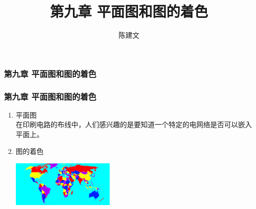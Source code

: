 \documentclass{beamer}
\begin{document}
\begin{CJK}{UTF8}{gbsn}
\newtheorem{definition9.1.1}{定义9.1.1}
\newtheorem{definition9.1.2}{定义9.1.2}
\newtheorem{theorem9.1.1}{定理9.1.1（欧拉公式）}
\newtheorem{corollary9.1.1}{推论9.1.1}
\newtheorem{corollary9.1.2}{推论9.1.2}
\newtheorem{corollary9.1.3}{推论9.1.3}
\newtheorem{corollary9.1.4}{推论9.1.4}
\newtheorem{corollary9.1.5}{推论9.1.5}
\newtheorem{corollary9.1.6}{推论9.1.6}
\newtheorem{theorem9.2.1}{定理9.2.1}
\newtheorem{definition9.3.1}{定义9.3.1}
\newtheorem{definition9.3.2}{定义9.3.2}
\newtheorem{definition9.3.3}{定义9.3.3}
\newtheorem{definition9.3.4}{定义9.3.4}
\newtheorem{theorem9.3.1}{定理9.3.1}
\newtheorem{theorem9.3.2}{定理9.3.2}
\newtheorem{definition9.4.1}{定义9.4.1}
\newtheorem{definition9.4.2}{定义9.4.2}
\newtheorem{theorem9.4.1}{定理9.4.1}
\newtheorem{theorem9.4.2}{定理9.4.2}
\newtheorem{theorem9.4.3}{定理9.4.3}
\newtheorem{theorem9.4.4}{定理9.4.4}
\newtheorem{theorem9.4.5}{定理9.4.5}
\newtheorem{theorem9.4.6}{定理9.4.6}
\newtheorem{exercise1}{习题1}
\newtheorem{exercise2}{习题2}
\newtheorem{exercise3}{习题3}
\newtheorem{exercise4}{习题4}
\date{}
\author{陈建文}

\title{第九章 平面图和图的着色}
\begin{frame}
  \titlepage
  
\end{frame}
\begin{frame}
  \frametitle{第九章 平面图和图的着色}
\end{frame}

\begin{frame}
  \frametitle{第九章 平面图和图的着色}
  \begin{enumerate}
  \item 平面图\\
\pause
在印刷电路的布线中，人们感兴趣的是要知道一个特定的电网络是否可以嵌入平面上。
\pause
\item 图的着色\\
\pause
\includegraphics[width=5cm,height=3cm]{Worldmap}
  \end{enumerate}
\end{frame}



\end{CJK}
\end{document}
